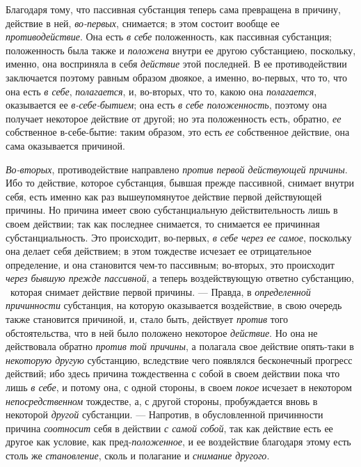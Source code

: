 Благодаря тому, что пассивная субстанция теперь сама превращена в причину,
действие в ней, {\em во-первых}, снимается; в этом
состоит вообще ее {\em противодействие}. Она есть
{\em в себе} положенность, как пассивная субстанция;
положенность была также и {\em положена} внутри ее
другою субстанциею, поскольку, именно, она восприняла в себя
{\em действие} этой последней. В ее противодействии
заключается поэтому равным образом двоякое, а именно, во-первых, что то,
что она есть {\em в себе},
{\em полагается}, и, во-вторых, что то, какою она
{\em полагается}, оказывается ее
{\em в-себе-бытием}; она есть
{\em в себе положенность}, поэтому она получает
некоторое действие от другой; но эта положенность есть, обратно,
{\em ее} собственное в-себе-бытие: таким образом, это
есть {\em ее} собственное действие, она сама
оказывается причиной.

{\em Во-вторых}, противодействие направлено
{\em против первой действующей причины}. Ибо то
действие, которое субстанция, бывшая прежде пассивной, снимает внутри себя,
есть именно как раз вышеупомянутое действие первой действующей причины. Но
причина имеет свою субстанциальную действительность лишь в своем действии;
так как последнее снимается, то снимается ее причинная субстанциальность.
Это происходит, во-первых, {\em в себе через ее самое},
поскольку она делает себя действием; в этом тождестве исчезает ее
отрицательное определение, и она становится чем-то пассивным; во-вторых,
это происходит {\em через бывшую прежде пассивной}, а
теперь воздействующую ответно субстанцию, \ которая снимает действие первой
причины. — Правда, в {\em определенной причинности}
субстанция, на которую оказывается воздействие, в свою очередь также
становится причиной, и, стало быть, действует
{\em против} того обстоятельства, что в ней было
положено некоторое {\em действие}. Но она не
действовала обратно {\em против той причины}, а
полагала свое действие опять-таки в {\em некоторую
другую} субстанцию, вследствие чего появлялся бесконечный прогресс
действий; ибо здесь причина тождественна с собой в своем действии пока что
лишь {\em в себе}, и потому она, с одной стороны, в
своем {\em покое} исчезает в некотором
{\em непосредственном} тождестве, а, с другой стороны,
пробуждается вновь в некоторой {\em другой} субстанции.
— Напротив, в обусловленной причинности причина
{\em соотносит} себя в действии
{\em с самой собой}, так как действие есть ее другое
как условие, как пред-{\em положенное}, и ее
воздействие благодаря этому есть столь же
{\em становление}, сколь и полагание и
{\em снимание другого}.

